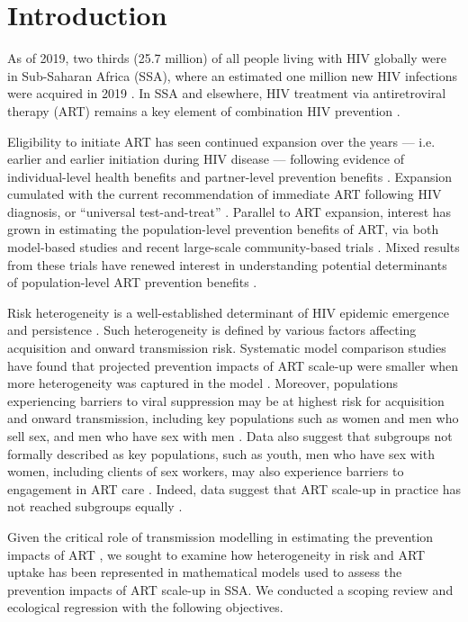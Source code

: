 \section{Introduction}
\label{s:intro}
As of 2019, two thirds (25.7 million) of all people living with HIV globally
were in Sub-Saharan Africa (SSA), where
an estimated one million new HIV infections were acquired in 2019 \cite{AIDSinfo}.
In SSA and elsewhere, HIV treatment via antiretroviral therapy (ART)
remains a key element of combination HIV prevention \cite{WHO2016ART}.
\par
Eligibility to initiate ART has seen continued expansion over the years
--- i.e. earlier and earlier initiation during HIV disease ---
following evidence of individual-level health benefits \cite{Lundgren2015,Danel2015}
and partner-level prevention benefits \cite{Anglemyer2013,Cohen2016}.
Expansion cumulated with the current recommendation of
immediate ART following HIV diagnosis, or ``universal test-and-treat'' \cite{WHO2016ART}.
Parallel to ART expansion, interest has grown in estimating
the population-level prevention benefits of ART, via both
model-based studies \cite{Granich2009,Eaton2012,Delva2012,Cori2014} and
recent large-scale community-based trials \cite{Havlir2019,Hayes2019,Iwuji2018}.
Mixed results from these trials \cite{Havlir2019,Hayes2019,Iwuji2018}
have renewed interest in understanding potential determinants of
population-level ART prevention benefits \cite{Baral2019,Havlir2020}.
\par
Risk heterogeneity is a well-established determinant of
HIV epidemic emergence and persistence \cite{Anderson1986,Boily1997}.
Such heterogeneity is defined by various factors affecting acquisition and onward transmission risk.
Systematic model comparison studies have found that projected prevention impacts of ART scale-up
were smaller when more heterogeneity was captured in the model \cite{Hontelez2013,Rozhnova2016}.
Moreover, populations experiencing barriers to viral suppression
may be at highest risk for acquisition and onward transmission, including key populations such as
women and men who sell sex, and men who have sex with men \cite{Hakim2018,Nyato2019}.
Data also suggest that subgroups not formally described as key populations,
such as youth, men who have sex with women, including clients of sex workers, may also
experience barriers to engagement in ART care \cite{Arnesen2017,Chikwari2018,Quinn2019}.
Indeed, data suggest that ART scale-up in practice
has not reached subgroups equally \cite{Green2020}.
\par
Given the critical role of transmission modelling
in estimating the prevention impacts of ART \cite{Eaton2012,Delva2012},
we sought to examine how heterogeneity in risk and ART uptake has been represented
in mathematical models used to assess the prevention impacts of ART scale-up in SSA.
We conducted a scoping review and ecological regression with the following objectives.


